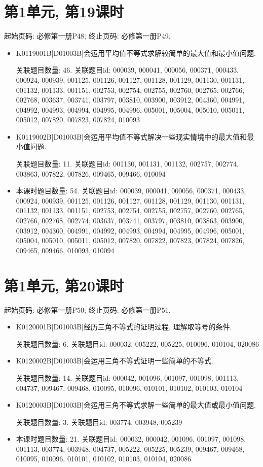 \section*{第1单元, 第19课时}
起始页码: 必修第一册P48; 终止页码: 必修第一册P49.
\begin{itemize}
\item K0119001B|D01003B|会运用平均值不等式求解较简单的最大值和最小值问题.

关联题目数量: 46. 关联题目id: 000039, 000041, 000056, 000371, 000433, 000924, 000939, 001125, 001126, 001127, 001128, 001129, 001130, 001131, 001132, 001133, 001151, 002753, 002754, 002755, 002760, 002765, 002766, 002768, 003637, 003741, 003797, 003810, 003900, 003912, 004360, 004991, 004992, 004993, 004994, 004995, 004996, 005001, 005004, 005010, 005011, 005012, 007820, 007823, 007824, 010093

\item K0119002B|D01003B|会运用平均值不等式解决一些现实情境中的最大值和最小值问题.

关联题目数量: 11. 关联题目id: 001130, 001131, 001132, 002757, 002774, 003863, 007822, 007826, 009465, 009466, 010094

\item 本课时题目数量: 54. 关联题目id: 000039, 000041, 000056, 000371, 000433, 000924, 000939, 001125, 001126, 001127, 001128, 001129, 001130, 001131, 001132, 001133, 001151, 002753, 002754, 002755, 002757, 002760, 002765, 002766, 002768, 002774, 003637, 003741, 003797, 003810, 003863, 003900, 003912, 004360, 004991, 004992, 004993, 004994, 004995, 004996, 005001, 005004, 005010, 005011, 005012, 007820, 007822, 007823, 007824, 007826, 009465, 009466, 010093, 010094

\end{itemize}

\section*{第1单元, 第20课时}
起始页码: 必修第一册P50; 终止页码: 必修第一册P51.
\begin{itemize}
\item K0120001B|D01003B|经历三角不等式的证明过程, 理解取等号的条件.

关联题目数量: 6. 关联题目id: 000032, 005222, 005225, 010096, 010104, 020086

\item K0120002B|D01003B|会运用三角不等式证明一些简单的不等式.

关联题目数量: 14. 关联题目id: 000042, 001096, 001097, 001098, 001113, 004737, 009467, 009468, 010095, 010096, 010101, 010102, 010103, 010104

\item K0120003B|D01003B|会运用三角不等式求解一些简单的最大值或最小值问题.

关联题目数量: 3. 关联题目id: 003774, 003948, 005239

\item 本课时题目数量: 21. 关联题目id: 000032, 000042, 001096, 001097, 001098, 001113, 003774, 003948, 004737, 005222, 005225, 005239, 009467, 009468, 010095, 010096, 010101, 010102, 010103, 010104, 020086

\end{itemize}

